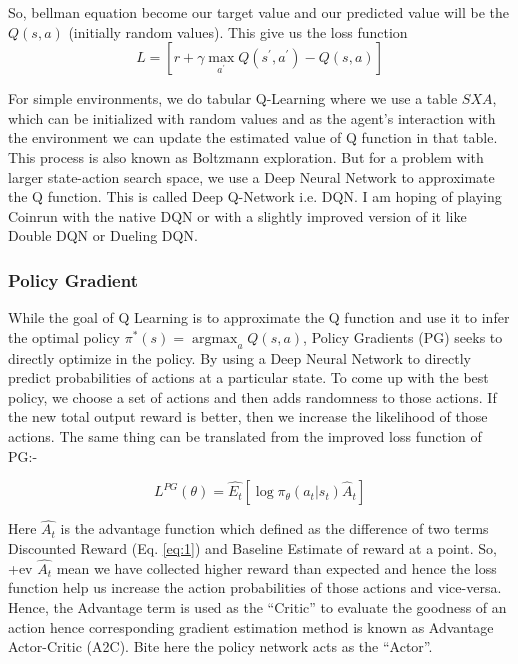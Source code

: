 \documentclass[10pt,twocolumn,letterpaper]{article}
\begin{document}
So, bellman equation become our target value and our predicted value will be the $Q(s,a)$ (initially random values). This give us the loss function
\begin{equation} 
\label{eq:qloss}
L=\left[r+\gamma \max _{a^{\prime}} Q\left(s^{\prime}, a^{\prime}\right)-Q(s, a)\right]
\end{equation}

For simple environments, we do tabular Q-Learning where we use a table $ S X A $, which can be initialized with random values and as the agent's interaction with the environment we can update the estimated value of Q function in that table. This process is also known as Boltzmann exploration. But for a problem with larger state-action search space, we use a Deep Neural Network to approximate the Q function. This is called Deep Q-Network i.e. DQN. I am hoping of playing Coinrun with the native DQN or with a slightly improved version of it like Double DQN or Dueling DQN.

\subsubsection{Policy Gradient}
\label{qlearn}

While the goal of Q Learning is to approximate the Q function and use it to infer the optimal policy $\pi^{*}(s)=\operatorname{argmax}_{a} Q(s, a)$, Policy Gradients (PG) seeks to directly optimize in the policy. By using a Deep Neural Network to directly predict probabilities of actions at a particular state. To come up with the best policy, we choose a set of actions and then adds randomness to those actions. If the new total output reward is better, then we increase the likelihood of those actions. The same thing can be translated from the improved loss function of PG:-

\begin{equation} 
\label{eq:pgloss}
L^{P G}(\theta)=\hat{E_{t}}\left[\log \pi_{\theta}\left(a_{t} | s_{t}\right) \hat{A}_{t}\right]
\end{equation}

Here $\hat{A_t}$ is the advantage function which defined as the difference of two terms Discounted Reward (Eq. \ref{eq:1}) and Baseline Estimate of reward at a point. So, +ev $\hat{A_t}$ mean we have collected higher reward than expected and hence the loss function help us increase the action probabilities of those actions and vice-versa. Hence, the Advantage term is used as the “Critic” to evaluate the goodness of an action hence corresponding gradient estimation method is known as Advantage Actor-Critic (A2C). Bite here the policy network acts as the “Actor”.
\end{document}
